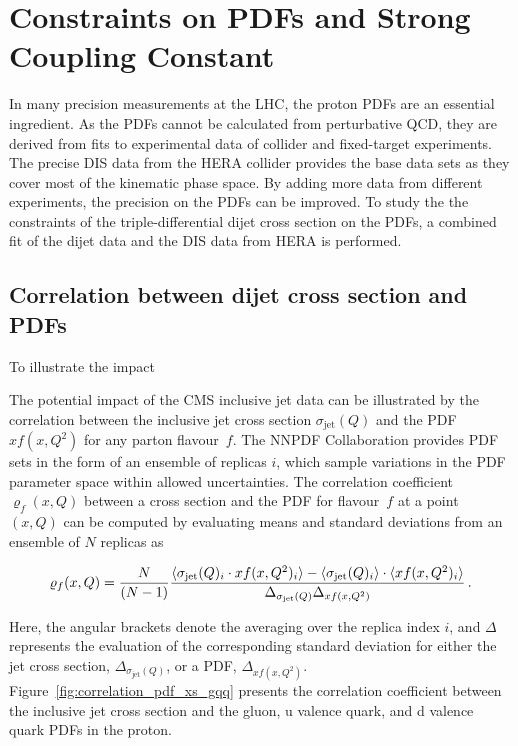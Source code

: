 
\chapter{Constraints on PDFs and Strong Coupling Constant}
\label{sec:pdf_constraints}

In many precision measurements at the LHC, the proton PDFs are an essential
ingredient. As the PDFs cannot be calculated from perturbative QCD, they are
derived from fits to experimental data of collider and fixed-target experiments.
The precise DIS data from the HERA collider provides the base data sets as they
cover most of the kinematic phase space. By adding more data from different
experiments, the precision on the PDFs can be improved. To study the the
constraints of the triple-differential dijet cross section on the PDFs, a
combined fit of the dijet data and the DIS data from HERA is performed.

\section{Correlation between dijet cross section and PDFs}
\label{sec:pdf_sensitivity}

To illustrate the impact 


The potential impact of the CMS inclusive jet data can be illustrated by the
correlation between the inclusive jet cross section $\sigma_{\mathrm{jet}}(Q)$
and the PDF $xf(x,Q^2)$ for any parton flavour~$f$. The NNPDF Collaboration
provides PDF sets in the form of an ensemble of replicas $i$, which sample
variations in the PDF parameter space within allowed uncertainties.  The
correlation coefficient $\varrho_f(x,Q)$ between a cross section and the PDF for
flavour~$f$ at a point $(x,Q)$ can be computed by evaluating means and standard
deviations from an ensemble of $N$ replicas as

\begin{equation}
  \varrho_f (x,Q) =
  \frac{N}{(N-1)} \frac{%
    \langle \sigma_{\mathrm{jet}}(Q)_i \cdot xf(x,Q^2)_i \rangle -
    \langle \sigma_{\mathrm{jet}}(Q)_i \rangle \cdot
    \langle xf(x,Q^2)_i \rangle}
  {\Delta_{\sigma_{\mathrm{jet}}(Q)} \Delta_{xf(x,Q^2)}}\,.
\end{equation}

Here, the angular brackets denote the averaging over the replica index
$i$, and $\Delta$ represents the evaluation of the corresponding
standard deviation for either the jet cross section,
$\Delta_{\sigma_{\mathrm{jet}}(Q)}$, or a PDF, $\Delta_{xf(x,Q^2)}$.
Figure~\ref{fig:correlation_pdf_xs_gqq} presents the correlation
coefficient between the inclusive jet cross section and the gluon, u
valence quark, and d valence quark PDFs in the proton.

